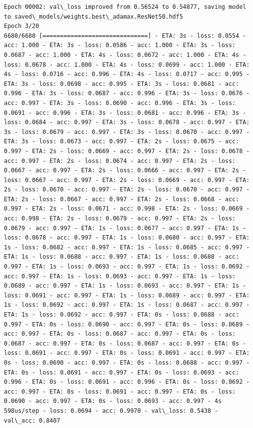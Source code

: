 \documentclass[11pt]{article}
\begin{document}
\begin{Verbatim}[commandchars=\\\{\}]
Epoch 00002: val\_loss improved from 0.56524 to 0.54877, saving model to saved\_models/weights.best\_adamax.ResNet50.hdf5
Epoch 3/20
6680/6680 [==============================] - ETA: 3s - loss: 0.0554 - acc: 1.000 - ETA: 3s - loss: 0.0586 - acc: 1.000 - ETA: 3s - loss: 0.0687 - acc: 1.000 - ETA: 4s - loss: 0.0672 - acc: 1.000 - ETA: 4s - loss: 0.0678 - acc: 1.000 - ETA: 4s - loss: 0.0699 - acc: 1.000 - ETA: 4s - loss: 0.0716 - acc: 0.996 - ETA: 4s - loss: 0.0717 - acc: 0.995 - ETA: 3s - loss: 0.0698 - acc: 0.995 - ETA: 3s - loss: 0.0681 - acc: 0.996 - ETA: 3s - loss: 0.0687 - acc: 0.996 - ETA: 3s - loss: 0.0676 - acc: 0.997 - ETA: 3s - loss: 0.0690 - acc: 0.996 - ETA: 3s - loss: 0.0691 - acc: 0.996 - ETA: 3s - loss: 0.0681 - acc: 0.996 - ETA: 3s - loss: 0.0684 - acc: 0.997 - ETA: 3s - loss: 0.0678 - acc: 0.997 - ETA: 3s - loss: 0.0679 - acc: 0.997 - ETA: 3s - loss: 0.0670 - acc: 0.997 - ETA: 3s - loss: 0.0673 - acc: 0.997 - ETA: 2s - loss: 0.0675 - acc: 0.997 - ETA: 2s - loss: 0.0669 - acc: 0.997 - ETA: 2s - loss: 0.0678 - acc: 0.997 - ETA: 2s - loss: 0.0674 - acc: 0.997 - ETA: 2s - loss: 0.0667 - acc: 0.997 - ETA: 2s - loss: 0.0666 - acc: 0.997 - ETA: 2s - loss: 0.0667 - acc: 0.997 - ETA: 2s - loss: 0.0669 - acc: 0.997 - ETA: 2s - loss: 0.0670 - acc: 0.997 - ETA: 2s - loss: 0.0670 - acc: 0.997 - ETA: 2s - loss: 0.0667 - acc: 0.997 - ETA: 2s - loss: 0.0668 - acc: 0.997 - ETA: 2s - loss: 0.0671 - acc: 0.998 - ETA: 2s - loss: 0.0669 - acc: 0.998 - ETA: 2s - loss: 0.0679 - acc: 0.997 - ETA: 2s - loss: 0.0679 - acc: 0.997 - ETA: 1s - loss: 0.0677 - acc: 0.997 - ETA: 1s - loss: 0.0678 - acc: 0.997 - ETA: 1s - loss: 0.0680 - acc: 0.997 - ETA: 1s - loss: 0.0682 - acc: 0.997 - ETA: 1s - loss: 0.0685 - acc: 0.997 - ETA: 1s - loss: 0.0688 - acc: 0.997 - ETA: 1s - loss: 0.0688 - acc: 0.997 - ETA: 1s - loss: 0.0693 - acc: 0.997 - ETA: 1s - loss: 0.0692 - acc: 0.997 - ETA: 1s - loss: 0.0693 - acc: 0.997 - ETA: 1s - loss: 0.0689 - acc: 0.997 - ETA: 1s - loss: 0.0693 - acc: 0.997 - ETA: 1s - loss: 0.0691 - acc: 0.997 - ETA: 1s - loss: 0.0689 - acc: 0.997 - ETA: 1s - loss: 0.0692 - acc: 0.997 - ETA: 1s - loss: 0.0687 - acc: 0.997 - ETA: 1s - loss: 0.0692 - acc: 0.997 - ETA: 0s - loss: 0.0688 - acc: 0.997 - ETA: 0s - loss: 0.0690 - acc: 0.997 - ETA: 0s - loss: 0.0689 - acc: 0.997 - ETA: 0s - loss: 0.0687 - acc: 0.997 - ETA: 0s - loss: 0.0687 - acc: 0.997 - ETA: 0s - loss: 0.0687 - acc: 0.997 - ETA: 0s - loss: 0.0691 - acc: 0.997 - ETA: 0s - loss: 0.0691 - acc: 0.997 - ETA: 0s - loss: 0.0690 - acc: 0.997 - ETA: 0s - loss: 0.0688 - acc: 0.997 - ETA: 0s - loss: 0.0691 - acc: 0.997 - ETA: 0s - loss: 0.0693 - acc: 0.996 - ETA: 0s - loss: 0.0691 - acc: 0.996 - ETA: 0s - loss: 0.0692 - acc: 0.997 - ETA: 0s - loss: 0.0691 - acc: 0.997 - ETA: 0s - loss: 0.0690 - acc: 0.997 - ETA: 0s - loss: 0.0693 - acc: 0.997 - 4s 598us/step - loss: 0.0694 - acc: 0.9970 - val\_loss: 0.5438 - val\_acc: 0.8407


\end{Verbatim}
\end{document}
